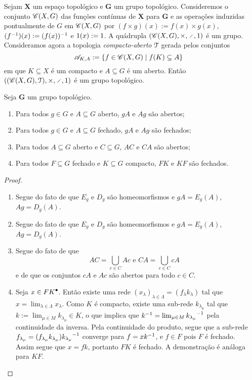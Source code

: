 \begin{example}
Sejam $\bm X$ um espaço topológico e $\bm G$ um grupo topológico. Consideremos o conjunto $\mathscr{C}(X,G)$ das funções contínuas de $\bm X$ para $\bm G$ e as operações induzidas pontualmente de $G$ em $\mathscr{C}(X,G)$ por $(f \times g)(x) := f(x) \times g(x)$, $(f^{-1})(x) := (f(x))^{-1}$ e $1(x) := 1$. A quádrupla $(\Cont(X,G),\times,\div,\id)$ é um grupo. Consideramos agora a topologia \emph{compacto-aberto} $\mathcal{T}$ gerada pelos conjuntos
	\begin{equation*}
	\mathscr A_{K,A} := \left\{{f \in \mathscr{C}(X,G)}\;\middle\vert\;{f(K) \subseteq A}\right\}
	\end{equation*}
em que $K \subseteq X$ é um compacto e $A \subseteq G$ é um aberto. Então $((\Cont(X,G),\topo),\times,\div,\id)$ é um grupo topológico.
\end{example}

\begin{proposition}
Seja $\bm G$ um grupo topológico.
	\begin{enumerate}
	\item Para todos $g \in G$ e $A \subseteq G$ aberto, $gA$ e $Ag$ são abertos;
	\item Para todos $g \in G$ e $A \subseteq G$ fechado, $gA$ e $Ag$ são fechados;
	\item Para todos $A \subseteq G$ aberto e $C \subseteq G$, $AC$ e $CA$ são abertos;
	\item Para todos $F \subseteq G$ fechado e $K \subseteq G$ compacto, $FK$ e $KF$ são fechados.
	\end{enumerate}
\end{proposition}
\begin{proof}
	\begin{enumerate}
	\item Segue do fato de que $E_g$ e $D_g$ são homeomorfismos e $gA = E_g(A)$, $Ag = D_g(A)$.
	\item Segue do fato de que $E_g$ e $D_g$ são homeomorfismos e $gA = E_g(A)$, $Ag = D_g(A)$.
	\item Segue do fato de que
		\begin{equation*}
		AC = \bigcup_{c \in C} Ac \text{\ \ e\ \ } CA = \bigcup_{c \in C} cA
		\end{equation*}
e de que os conjuntos $cA$ e $Ac$ são abertos para todo $c \in C$.
	\item Seja $x \in {FK}^\bullet$. Então existe uma rede $(x_\lambda)_{\lambda \in \Lambda} = (f_\lambda k_\lambda)$ tal que $x = \lim_{\lambda \in \Lambda} x_\lambda$. Como $K$ é compacto, existe uma sub-rede $k_{\lambda_\mu}$ tal que $k := \lim_{\mu \in M} k_{\lambda_\mu} \in K$, o que implica que $k^{-1} = \lim_{\mu \in M} {k_{\lambda_\mu}}^{-1}$ pela continuidade da inversa. Pela continuidade do produto, segue que a sub-rede $f_{\lambda_\mu} = (f_{\lambda_\mu}k_{\lambda_\mu}){k_{\lambda_\mu}}^{-1}$ converge para $f = xk^{-1}$, e $f \in F$ pois $F$ é fechado. Assim segue que $x=fk$, portanto $FK$ é fechado. A demonstração é análoga para $KF$.
	\end{enumerate}
\end{proof}

